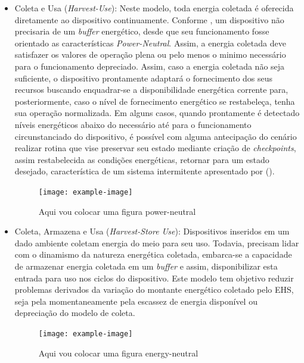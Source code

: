 \begin{itemize}
    \item Coleta e Usa (\textit{Harvest-Use}): Neste modelo, toda energia coletada é oferecida diretamente ao dispositivo continuamente. Conforme \cite{merrett_energy-driven_2017}, um dispositivo não precisaria de um \textit{buffer} energético, desde que seu funcionamento fosse orientado as características \textit{Power-Neutral}. Assim, a energia coletada deve satisfazer os valores de operação plena ou pelo menos o minimo necessário para o funcionamento depreciado. Assim, caso a energia coletada não seja suficiente, o dispositivo prontamente adaptará o fornecimento dos seus recursos buscando enquadrar-se a disponibilidade energética corrente para, posteriormente, caso o nível de fornecimento energético se restabeleça, tenha sua operação normalizada. Em alguns casos, quando prontamente é detectado níveis energéticos abaixo do necessário até para o funcionamento circunstanciado do dispositivo, é possível com alguma antecipação do cenário realizar rotina que vise preservar seu estado mediante criação de \textit{checkpoints}, assim restabelecida as condições energéticas, retornar para um estado desejado, característica de um sistema intermitente apresentado por \citeauthor{sliper_energy-driven_2020} (\citeyear{sliper_energy-driven_2020}).
    
	\begin{figure}[h]
			\centering
			\noindent\texttt{[image: example-image]} 
			\caption{Aqui vou colocar uma figura power-neutral}	
	\end{figure}   
    
    \item Coleta, Armazena e Usa (\textit{Harvest-Store Use}): Dispositivos inseridos em um dado ambiente coletam energia do meio para seu uso. Todavia, precisam lidar com o dinamismo da natureza energética coletada, embarca-se a capacidade de armazenar energia coletada em um \textit{buffer} e assim, disponibilizar esta entrada para uso nos ciclos do dispositivo. Este modelo tem objetivo reduzir problemas derivados da variação do montante energético coletado pelo \acs{EHS}, seja pela momentaneamente pela escassez de energia disponível ou depreciação do modelo de coleta.
    
    \begin{figure}[h]
    	\centering
    	\noindent\texttt{[image: example-image]} 
    	\caption{Aqui vou colocar uma figura energy-neutral}	
   	\end{figure}  
    
\end{itemize}



